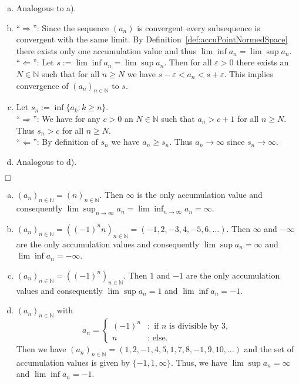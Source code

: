 \begin{enumerate}[a)]
\item Analogous to a).

\item ``$\Rightarrow$'': Since the sequence $(a_{n})$ is convergent every subsequence is convergent with the same limit. By Definition~\ref{def:accuPointNormedSpace} there exists only one accumulation value and thus $\lim\inf a_n=\lim\sup a_n$.\\%
``$\Leftarrow$'': Let $s:=\lim\inf a_n=\lim\sup a_n$. Then for all $\varepsilon>0$ there exists an $N\in\mathbb{N}$ such that for all $n\geq N$ we have $s-\varepsilon<a_{n}<s+\varepsilon$. This implies convergence of $(a_{n})_{n\in\mathbb{N}}$ to $s$.

\item Let $s_{n}:=\inf \{a_{k}:k\geq n\}$.\\
``$\Rightarrow$'': We have for any $c>0$ an $N\in\mathbb{N}$ such that $a_{n}> c+1$ for all $n\geq N$. Thus $s_{n}>c$ for all $n\geq N$.\\
``$\Leftarrow$'': By definition of $s_{n}$ we have $a_{n}\geq s_{n}$. Thus $a_{n}\rightarrow\infty$ since $s_{n}\rightarrow\infty$.

\item Analogous to d).
\end{enumerate}
$\Box$

\begin{example}
 \begin{enumerate}[(a)]
  \item $(a_n)_{n\in\mathbb{N}}=(n)_{n\in\mathbb{N}}$. Then $\infty$ is the only accumulation value and consequently $\lim\sup_{n \rightarrow \infty} a_n=\lim\inf_{n \rightarrow \infty} a_n=\infty$.
  \item $(a_n)_{n\in\mathbb{N}}=((-1)^nn)_{n\in\mathbb{N}}=(-1,2,-3,4,-5,6,\ldots)$. Then $\infty$ and $-\infty$ are the only accumulation values and consequently $\lim\sup a_n=\infty$ and $\lim\inf a_n=-\infty$.
  \item $(a_n)_{n\in\mathbb{N}}=((-1)^n)_{n\in\mathbb{N}}$. Then $1$ and $-1$ are the only accumulation values and consequently $\lim\sup a_n=1$ and $\lim\inf a_n=-1$.
  \item $(a_n)_{n\in\mathbb{N}}$ with
\[a_n=\begin{cases}(-1)^n&:\text{ if }n\text{ is divisible by }3,\\n&:\text{ else.}\end{cases}\]
Then we have $(a_n)_{n\in\mathbb{N}}=(1,2,-1,4,5,1,7,8,-1,9,10,\ldots)$ and the set of accumulation values is given by $\{-1,1,\infty\}$. Thus, we have $\lim\sup a_n=\infty$ and $\lim\inf a_n=-1$.
 \end{enumerate}
\end{example}
